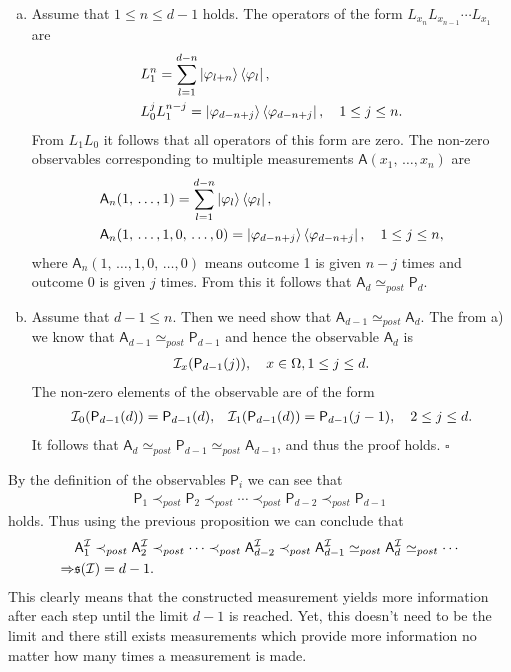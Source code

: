 \documentclass[a4paper,12pt]{wihuri}
\theoremstyle{definition}
\numberwithin{definition}{section}
\numberwithin{example}{section}
\numberwithin{theorem}{section}
\numberwithin{proposition}{section}
\numberwithin{lemma}{section}
\newcommand{\I}{\mathcal{I}}%
\newcommand{\A}{\mathsf{A}}%
\newcommand{\p}{\mathsf{P}}%
\newcommand{\sat}{\mathfrak{s}}
\newcommand{\spp}{\simeq_{post}}
\newcommand{\ppeq}{\prec_{post}}
\begin{document}
\begin{enumerate}[a)]
\item Assume that $1 \leq n \leq d-1$ holds. The operators of the form $L_{x_n}L_{x_{n-1}}\cdots L_{x_1}$ are  
\begin{align*}
&L_1^n = \sum_{l=1}^{d-n} \ket{\varphi_{l+n}}\bra{\varphi_l},\\
&L_0^jL_1^{n-j} = \ket{\varphi_{d-n+j}}\bra{\varphi_{d-n+j}},\quad 1 \leq j \leq n\text.
\end{align*}
From $L_1L_0$ it follows that all operators of this form are zero. The non-zero observables corresponding to multiple measurements $\A(x_1, \,\ldots,x_n)$ are
\begin{align*}
&\A_n(1, \,\ldots,1) = \sum_{l=1}^{d-n}\ket{\varphi_l}\bra{\varphi_l},\\
&\A_n(1,\,\ldots, 1, 0,\,\ldots,0) = \ket{\varphi_{d-n+j}}\bra{\varphi_{d-n+j}}, \quad 1 \leq j \leq n,
\end{align*}
where $\A_n(1,\,\ldots, 1, 0,\,\ldots,0)$ means outcome 1 is given $n-j$ times and outcome 0 is given $j$ times. From this it follows that $\A_{d} \spp \p_d$.

\item Assume that $d-1 \leq n$. Then we need show that $\A_{d-1} \spp \A_d$. The from a) we know that $\A_{d-1} \spp \p_{d-1}$ and hence the observable $\A_d$ is 
\begin{align*}
\I_x(\p_{d-1}(j)), \quad x \in \Omega, 1 \leq j \leq d\text.
\end{align*}
The non-zero elements of the observable are of the form
\begin{align*}
&\I_0(\p_{d-1}(d)) = \p_{d-1}(d),
&\I_1(\p_{d-1}(d)) = \p_{d-1}(j-1), \quad 2 \leq j \leq d\text.
\end{align*}
It follows that $\A_d \spp \p_{d-1} \spp \A_{d-1}$, and thus the proof holds. \hfill $\square$
\end{enumerate}
By the definition of the observables $\p_i$ we can see that
\begin{align*}
\p_1\ppeq\p_2\ppeq\cdots\ppeq\p_{d-2}\ppeq\p_{d-1}
\end{align*}
holds. Thus using the previous proposition we can conclude that
\begin{align*}
&\A_1^\I\ppeq\A_2^\I\ppeq\cdots\ppeq\A_{d-2}^\I\ppeq\A_{d-1}^\I \spp \A_d^\I \spp \cdots\\
\Rightarrow &\sat(\I) = d-1\text.
\end{align*}
This clearly means that the constructed measurement yields more information after each step until the limit $d-1$ is reached. Yet, this doesn't need to be the limit and there still exists measurements which provide more information no matter how many times a measurement is made.
\end{document}
